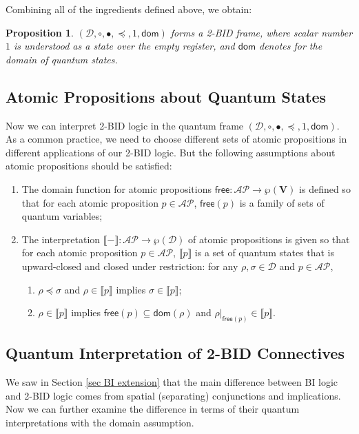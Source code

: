 \documentclass[conference,compsoc, 10pt]{IEEEtran}
\newtheorem{proposition}{Proposition}[section]
\newcommand {\cD } {{\mathcal{D}}}
\newcommand {\types } {{\mathsf{dom}}}
\newcommand {\type }[1] {{\mathsf{dom}\!\left(#1\right)}}
\newcommand {\rt }[2] {{\left.{#1}\right|_{#2}}}
\newcommand {\vars } {\mathbf{V}}
\newcommand {\V }[1] {{\mathsf{free}{\left(#1\right)}}}
\newcommand {\Vs } {{\mathsf{free}}}
\newcommand {\sem}[1] {\llbracket#1\rrbracket}
\newcommand {\AP} {{\mathcal{AP}}}
\begin{document}
\begin{appendices}
		Combining all of the ingredients defined above, we obtain: 
		
		\begin{proposition} $(\cD,\circ,\bullet, \preceq,1,\types)$ forms a 2-BID frame, where scalar number $1$ is understood as a state over the empty register, and $\types$ denotes for the domain of quantum states. \end{proposition}	
		
		\subsection{Atomic Propositions about Quantum States}
		\label{sec free choice of AP 2BID}
		
		Now we can interpret 2-BID logic in the quantum frame $(\cD,\circ,\bullet, \preceq,1,\types)$. As a common practice, we need to choose different sets of atomic propositions in different applications of our 2-BID logic. But the following assumptions about atomic propositions should be satisfied:
		\begin{enumerate}
			\item The domain function for atomic propositions $\Vs:\AP\rightarrow\wp(\vars)$ is defined so that for each atomic proposition $p\in\AP$, $\Vs(p)$ is a family of sets of quantum variables;  
			\item The interpretation $\sem{-}: \AP\rightarrow\wp(\cD)$ of atomic propositions is given so that for each atomic proposition $p\in\AP$, $\sem{p}$ is a set of quantum states that is upward-closed and closed under restriction: for any $\rho,\sigma\in\cD$ and $p\in\AP$,
			\begin{enumerate}
				\item $\rho\preceq \sigma$ and $\rho\in\sem{p}$ implies $\sigma\in\sem{p}$;
				\item $\rho\in\sem{p}$ implies $\V{p}\subseteq\type{\rho}$ and  $\rt{\rho}{\V{p}}\in\sem{p}$.
			\end{enumerate}
		\end{enumerate}
		
		\subsection{Quantum Interpretation of 2-BID Connectives}
		\label{sec app sub Quantum Interpretation of 2-BID Connectives}
		We saw in Section \ref{sec BI extension} that the main difference between BI logic and 2-BID logic comes from spatial (separating) conjunctions and implications. Now we can further examine the difference in terms of their quantum interpretations with the domain assumption.    
		

\end{appendices}
\end{document}
